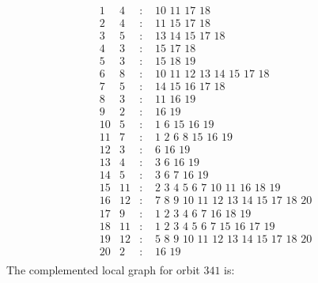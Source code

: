 \documentclass[12pt]{article}
\begin{document}
\begin{equation*}
\begin{array}{rrcl}
1&4&:&\,\,10\,\,11\,\,17\,\,18\\
2&4&:&\,\,11\,\,15\,\,17\,\,18\\
3&5&:&\,\,13\,\,14\,\,15\,\,17\,\,18\\
4&3&:&\,\,15\,\,17\,\,18\\
5&3&:&\,\,15\,\,18\,\,19\\
6&8&:&\,\,10\,\,11\,\,12\,\,13\,\,14\,\,15\,\,17\,\,18\\
7&5&:&\,\,14\,\,15\,\,16\,\,17\,\,18\\
8&3&:&\,\,11\,\,16\,\,19\\
9&2&:&\,\,16\,\,19\\
10&5&:&\,\,1\,\,6\,\,15\,\,16\,\,19\\
11&7&:&\,\,1\,\,2\,\,6\,\,8\,\,15\,\,16\,\,19\\
12&3&:&\,\,6\,\,16\,\,19\\
13&4&:&\,\,3\,\,6\,\,16\,\,19\\
14&5&:&\,\,3\,\,6\,\,7\,\,16\,\,19\\
15&11&:&\,\,2\,\,3\,\,4\,\,5\,\,6\,\,7\,\,10\,\,11\,\,16\,\,18\,\,19\\
16&12&:&\,\,7\,\,8\,\,9\,\,10\,\,11\,\,12\,\,13\,\,14\,\,15\,\,17\,\,18\,\,20\\
17&9&:&\,\,1\,\,2\,\,3\,\,4\,\,6\,\,7\,\,16\,\,18\,\,19\\
18&11&:&\,\,1\,\,2\,\,3\,\,4\,\,5\,\,6\,\,7\,\,15\,\,16\,\,17\,\,19\\
19&12&:&\,\,5\,\,8\,\,9\,\,10\,\,11\,\,12\,\,13\,\,14\,\,15\,\,17\,\,18\,\,20\\
20&2&:&\,\,16\,\,19\\
\end{array}
\end{equation*}
The complemented local graph for orbit $341$ is:
\end{document}
